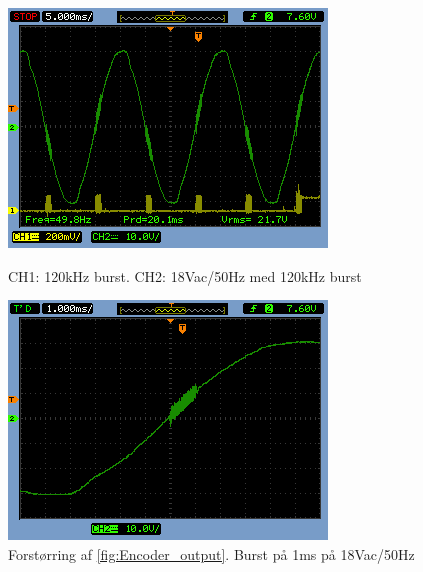 \begin{figure}[htb]
  \begin{minipage}{0.45\textwidth}
    \centering
      \includegraphics[width=\textwidth]{billeder/HWTest/Encoder/Encoder_50Hz_burst_120kHz}
		\caption{CH1: 120kHz burst. CH2: 18Vac/50Hz med 120kHz burst}
    \label{fig:Encoder_output}
  \end{minipage}
  \hspace{0.1\textwidth}
  \begin{minipage}{0.45\textwidth}
    \centering
      \includegraphics[width=\textwidth]{billeder/HWTest/Encoder/Encoder_burst_1ms}
		\caption{Forstørring af \ref{fig:Encoder_output}. Burst på 1ms på 18Vac/50Hz}
    \label{fig:Encoder_burst_1ms}
  \end{minipage}
\end{figure}

